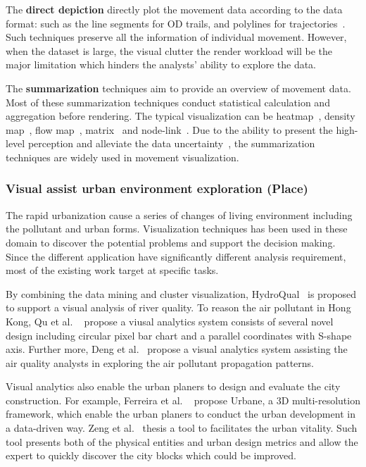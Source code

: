 The \textbf{direct depiction} directly plot the movement data according to the data format: such as the line segments for OD trails, and polylines for trajectories~\cite{andrienko2013visual, ferreira2013visual, kruger2013trajectorylenses}. Such techniques preserve all the information of individual movement. However, when the dataset is large, the visual clutter the render workload will be the major limitation which hinders the analysts’ ability to explore the data.

The \textbf{summarization} techniques aim to provide an overview of movement data. Most of these summarization techniques conduct statistical calculation and aggregation before rendering. The typical visualization can be heatmap~\cite{wilkinson2009history}, density map~\cite{lanir2014visualizing}, flow map~\cite{guo2014origin}, matrix~\cite{wood2010visualisation} and node-link~\cite{von2016mobilitygraphs}. Due to the ability to present the high-level perception and alleviate the data uncertainty~\cite{andrienko2013visual}, the summarization techniques are widely used in movement visualization. 

\subsubsection{Visual assist urban environment exploration (Place)}
The rapid urbanization cause a series of changes of living environment including the pollutant and urban forms. Visualization techniques has been used in these domain to discover the potential problems and support the decision making. Since the different application have significantly different analysis requirement, most of the existing work target at specific tasks.  

By combining the data mining and cluster visualization, HydroQual~\cite{accorsi2014hydroqual} is proposed to support a visual analysis of river quality. 
To reason the air pollutant in Hong Kong, Qu et al. ~\cite{qu2007visual} propose a viusal analytics system consists of several novel design including  circular pixel bar chart and a parallel coordinates with S-shape axis.  Further more, Deng et al.~\cite{deng2019airvis} propose a visual analytics system assisting the air quality analysts in exploring the air pollutant propagation patterns. 

Visual analytics also enable the urban planers to design and evaluate the city construction. For example, Ferreira et al. ~\cite{ferreira2015urbane} propose Urbane, a 3D multi-resolution framework, which enable the urban planers to conduct the urban development in a data-driven way. Zeng et al.~\cite{zeng2018vitalvizor} thesis a tool to facilitates the urban vitality. Such tool presents both of the physical entities and urban design metrics and allow the expert to quickly discover the city blocks which could be improved.
